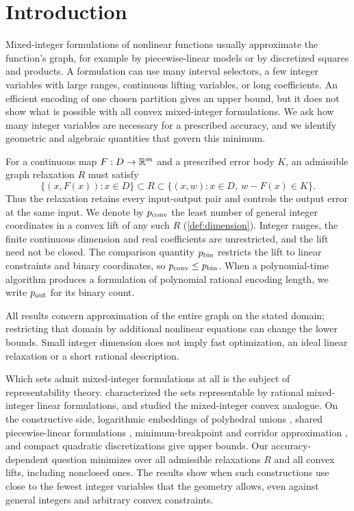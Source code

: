 \section{Introduction}\label{sec:introduction}

Mixed-integer formulations of nonlinear functions usually approximate
the function's graph, for example by piecewise-linear models or by
discretized squares and products. A formulation can use many interval
selectors, a few integer variables with large ranges, continuous lifting
variables, or long coefficients. An efficient encoding of one chosen
partition gives an upper bound, but it does not show what is possible
with all convex mixed-integer formulations. We ask how many integer variables are
necessary for a prescribed accuracy, and we identify geometric and
algebraic quantities that govern this minimum.

For a continuous map $F:D\to\mathbb R^m$ and a prescribed error body $K$, an
admissible graph relaxation $R$ must satisfy
\[
 \{(x,F(x)):x\in D\}\subset R
 \subset\{(x,w):x\in D,\ w-F(x)\in K\}.
\]
Thus the relaxation retains every input-output pair and controls the
output error at the same input. We denote by $p_{\mathrm{conv}}$ the least number
of general integer coordinates in a convex lift of any such $R$
(\cref{def:dimension}). Integer ranges, the finite continuous dimension
and real coefficients are unrestricted, and the lift need not be closed. The
comparison quantity $p_{\mathrm{bin}}$ restricts the lift to linear constraints and
binary coordinates, so $p_{\mathrm{conv}}\le p_{\mathrm{bin}}$. When a polynomial-time
algorithm produces a formulation of polynomial rational encoding length,
we write $p_{\mathrm{out}}$ for its binary count.

All results concern approximation of the entire graph on the stated
domain; restricting that domain by additional nonlinear equations can
change the lower bounds. Small integer dimension does not imply fast
optimization, an ideal linear relaxation or a short rational
description.

Which sets admit mixed-integer formulations at all is the subject of
representability theory. \citet{jeroslow1984} characterized the sets
representable by rational mixed-integer linear formulations, and
\citet{lubin2022} studied the mixed-integer convex analogue. On the
constructive side, logarithmic embeddings of polyhedral unions \citep{vielma2018}, shared
piecewise-linear formulations \citep{lyu2026}, minimum-breakpoint and
corridor approximation \citep{rebennack2015,codsi2025}, and compact
quadratic discretizations \citep{beach2022} give upper bounds. Our
accuracy-dependent question minimizes over all admissible relaxations $R$
and all convex lifts, including nonclosed ones. The results show when
such constructions use close to the fewest integer variables that the
geometry allows, even against general integers and arbitrary convex
constraints.

